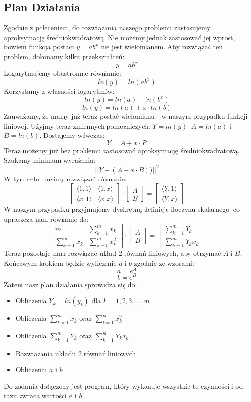 \documentclass[12pt,a4paper]{article}
\begin{document}
\subsection{Plan Działania}
Zgodnie z poleceniem, do rozwiązania naszego problemu zastosujemy aproksymację średniokwadratową. Nie możemy jednak zastosować jej wprost, bowiem funkcja postaci $y=ab^x$ nie jest wielomianem. Aby rozwiązać ten problem, dokonamy kilku przekształceń:\\
\[ y=ab^x\]
Logarytmujemy obustronnie równianie:
\[ ln(y)=ln(ab^x)\]
Korzystamy z własności logarytmów:
\[ ln(y)=ln(a)+ln(b^x)\]
\[ ln(y)=ln(a)+x\cdot ln(b)\]
Zauważamy, że mamy już teraz postać wielomianu - w naszym przypadku funkcji liniowej. Użyjmy teraz zmiennych pomocniczych: $Y=ln(y)$, $A=ln(a)$ i $B=ln(b)$. Dostajemy wówczas:
\[Y=A+x\cdot B\]
Teraz możemy już bez problemu zastosować aproksymację średniokwadratową. Szukamy minimum wyrażenia:
\[||Y - (A + x\cdot B))||^2\]
W tym celu musimy rozwiązać równanie:
\[
\begin{bmatrix}
\langle 1, 1 \rangle & \langle 1, x \rangle\\
\langle x, 1 \rangle & \langle x, x \rangle
\end{bmatrix}
\cdot
\begin{bmatrix}
A\\
B
\end{bmatrix}
=
\begin{bmatrix}
\langle Y, 1 \rangle\\
\langle Y, x \rangle
\end{bmatrix}
\]
W naszym przypadku przyjmujemy dyskretną definicję iloczynu skalarnego, co upraszcza nam równanie do:
\[
\begin{bmatrix}
m & \sum_{k=1}^{m} x_k \\
\sum_{k=1}^{m} x_k & \sum_{k=1}^{m} x_k^2
\end{bmatrix}
\cdot
\begin{bmatrix}
A\\
B
\end{bmatrix}
=
\begin{bmatrix}
\sum_{k=1}^{m} Y_k \\
\sum_{k=1}^{m} Y_k x_k
\end{bmatrix}
\]
Teraz pozostaje nam rozwiązać układ 2 równań liniowych, aby otrzymać $A$ i $B$. Końcowym krokiem będzie wyliczenie $a$ i $b$ zgodnie ze wzorami:
\[ a=e^A\]
\[ b=e^B\]
Zatem nasz plan działania sprowadza się do:
\begin{itemize}
\item Obliczenia $Y_k=ln(y_k)$ dla $k=1, 2, 3, ..., m$
\item Obliczenia $\sum_{k=1}^{m} x_k$ oraz $\sum_{k=1}^{m} x_k^2$
\item Obliczenia $\sum_{k=1}^{m} Y_k$ oraz $\sum_{k=1}^{m} Y_k x_k$
\item Rozwiązania układu 2 równań liniowych
\item Obliczeniu $a$ i $b$
\end{itemize}
Do zadania dołączony jest program, który wykonuje wszystkie te czynności i od razu zwraca wartości $a$ i $b$.
\end{document}
